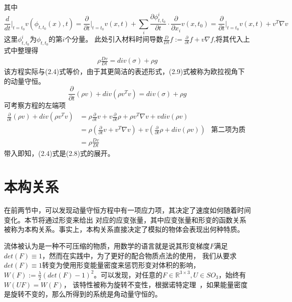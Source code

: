 其中$$\frac{d}{dt}\Big |_{t = t_0} v(\phi_{t,t_0}(x),t) = \frac{\partial}{\partial t}\Big |_{t = t_0}v(x,t) + \sum_i \frac{\partial \phi_{t,t_0}^i}{\partial t}  \cdot \frac{\partial}{\partial x_i}v(x,t_0) = \frac{\partial}{\partial t}\Big |_{t = t_0}v(x,t) + v^T\nabla v$$
这里$\phi_{t,t_0}^i$为$\phi_{t,t_0}$的第$i$个分量。
此处引入材料时间导数$\frac{D}{Dt}f := \frac{\partial}{\partial t} f + v\nabla f $,将其代入上式中整理得
\begin{equation}
    \begin{split}
        \rho \frac{Dv}{Dt} = div(\sigma) + \rho g
    \end{split}
\end{equation}
该方程实际与(2.4)式等价，由于其更简洁的表述形式，(2.9)式被称为欧拉视角下的动量守恒。
$$\frac{\partial}{\partial t}(\rho v) + div(\rho v^{T}v) = div(\sigma) + \rho g$$
可考察方程的左端项
\begin{align*}
    \frac{\partial}{\partial t}(\rho v) + div(\rho v^{T}v) & = \rho \frac{\partial}{\partial t} v + v \frac{\partial}{\partial t} \rho + \rho v^T\nabla v + v div(\rho v)                           \\
                                                           & = \rho (\frac{\partial}{\partial t} v + v^T\nabla v) + v(\frac{\partial}{\partial t} \rho + div(\rho v))     & \text{第二项为质量守恒} \\
                                                           & = \rho \frac{Dv}{Dt}
\end{align*}
带入即知，(2.4)式是(2.8)式的展开。

\section{本构关系}
在前两节中，可以发现动量守恒方程中有一项应力项，其决定了速度如何随着时间变化。本节将通过形变来给出
对应的应变张量，其中应变张量和形变的函数关系被称为本构关系。事实上，本构关系直接决定了模拟的物体会表现出何种特质。

流体被认为是一种不可压缩的物质，用数学的语言就是说其形变梯度$F$满足$det(F)\equiv 1$，然而在实践中，为了更好的配合物质点法的使用，
我们从要求$det(F)\equiv 1$转变为使用形变能量密度来惩罚形变对体积的影响，$W(F):= \frac{\lambda}{2} (det(F) - 1)^2$。可以发现，对任意的$F\in \mathbb{R}^{3\times 3}, U\in SO_3$，始终有$W(UF) = W(F)$，
该特性被称为旋转不变性，根据诺特定理~\cite{takhtadzhian2008quantum}，如果能量密度是旋转不变的，那么所得到的系统是角动量守恒的。


